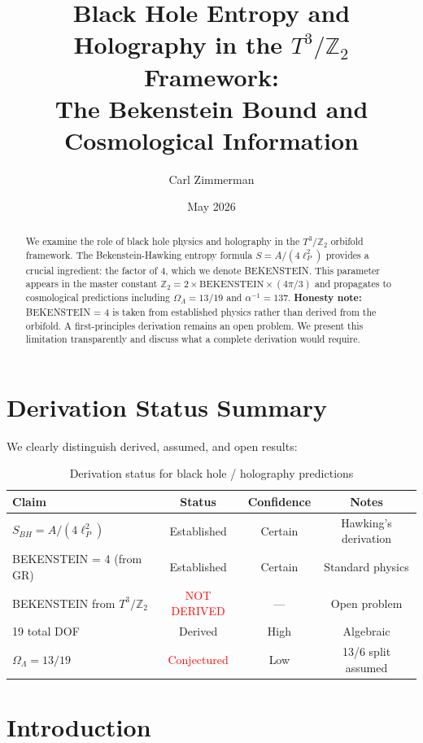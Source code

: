 \documentclass[12pt,a4paper]{article}
\title{Black Hole Entropy and Holography in the $T^3/\mathbb{Z}_2$ Framework:\\
The Bekenstein Bound and Cosmological Information}
\author{Carl Zimmerman}
\date{May 2026}
\begin{document}
\maketitle

\begin{abstract}
We examine the role of black hole physics and holography in the $T^3/\mathbb{Z}_2$ orbifold framework. The Bekenstein-Hawking entropy formula $S = A/(4\ell_P^2)$ provides a crucial ingredient: the factor of 4, which we denote BEKENSTEIN. This parameter appears in the master constant $\mathbb{Z}_2 = 2 \times \text{BEKENSTEIN} \times (4\pi/3)$ and propagates to cosmological predictions including $\Omega_\Lambda = 13/19$ and $\alpha^{-1} = 137$. \textbf{Honesty note:} BEKENSTEIN = 4 is taken from established physics rather than derived from the orbifold. A first-principles derivation remains an open problem. We present this limitation transparently and discuss what a complete derivation would require.
\end{abstract}

\section{Derivation Status Summary}

We clearly distinguish derived, assumed, and open results:

\begin{table}[h]
\centering
\begin{tabular}{lccc}
\toprule
Claim & Status & Confidence & Notes \\
\midrule
$S_{BH} = A/(4\ell_P^2)$ & \textcolor{green!50!black}{Established} & Certain & Hawking's derivation \\
BEKENSTEIN = 4 (from GR) & \textcolor{green!50!black}{Established} & Certain & Standard physics \\
BEKENSTEIN from $T^3/\mathbb{Z}_2$ & \textcolor{red}{NOT DERIVED} & --- & Open problem \\
19 total DOF & Derived & High & Algebraic \\
$\Omega_\Lambda = 13/19$ & \textcolor{red}{Conjectured} & Low & 13/6 split assumed \\
\bottomrule
\end{tabular}
\caption{Derivation status for black hole / holography predictions}
\end{table}

\section{Introduction}
\end{document}
